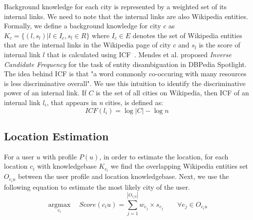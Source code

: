 Background knowledge for each city is represented by a weighted set of its internal links. We need to note that the internal links are also Wikipedia entities. Formally, we define a background knowledge for city $c$ as $K_{c}=\{(l,s_{l})|l \in I_{c}, s_{l} \in R\}$ where $I_{c} \in E$ denotes the set of Wikipedia entities that are the internal links in the Wikipedia page of city $c$ and $s_{l}$ is the score of internal link $l$ that is calculated using ICF~\cite{mendes2011dbpedia}. Mendes et al. \cite{mendes2011dbpedia} proposed \textit{Inverse Candidate Frequency} for the task of entity disambiguation in DBPedia Spotlight. The idea behind ICF is that "a word commonly co-occuring with many resources is less discriminative overall". We use this intuition to identify the discriminative power of an internal link. If $C$ is the set of all cities on Wikipedia, then ICF of an internal link $l_{i}$, that appears in \textit{n} cities, is defined as:
\begin{equation}
	ICF(l_{i}) = \log |C|- \log n
\end{equation}

\subsection{Location Estimation}
For a user $u$ with profile $P(u)$, in order to estimate the location, for each location $c_{i}$ with knowledgebase $K_{c_{i}}$ we find the overlapping Wikipedia entities set $O_{c_{i}u}$ between the user profile and location knowledgebase. Next, we use the following equation to estimate the most likely city of the user.     
\begin{equation}
	\underset{c_{i}}{\operatorname{argmax}} \quad  Score(c_{i}u) = \sum_{j=1}^{|O_{c_{i}u}|} w_{e_{j}} \times s_{e_{j}}  \qquad \forall e_{j} \in O_{c_{i}u}
\end{equation}




